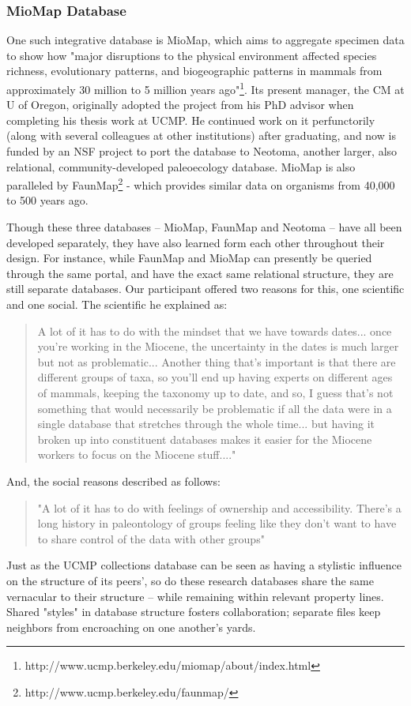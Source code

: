 \subsubsection{MioMap Database}
One such integrative database is MioMap, which aims to aggregate specimen data to show how "major disruptions to the physical environment affected species richness, evolutionary patterns, and biogeographic patterns in mammals from approximately 30 million to 5 million years ago"\footnote{http://www.ucmp.berkeley.edu/miomap/about/index.html}. Its present manager, the CM at U of Oregon, originally adopted the project from his PhD advisor when completing his thesis work at UCMP. He continued work on it perfunctorily (along with several colleagues at other institutions) after graduating, and now is funded by an NSF project to port the database to Neotoma, another larger, also relational, community-developed paleoecology database. MioMap is also paralleled by FaunMap\footnote{http://www.ucmp.berkeley.edu/faunmap/} - which provides similar data on organisms from 40,000 to 500 years ago.

Though these three databases -- MioMap, FaunMap and Neotoma -- have all been developed separately, they have also learned form each other throughout their design. For instance, while FaunMap and MioMap can presently be queried through the same portal, and have the exact same relational structure, they are still separate databases.  Our participant offered two reasons for this, one scientific and one social. The scientific he explained as:
\begin{quote}
A lot of it has to do with the mindset that we have towards dates... once you're working in the Miocene, the uncertainty in the dates is much larger but not as problematic... Another thing that's important is that there are different groups of taxa, so you'll end up having experts on different ages of mammals, keeping the taxonomy up to date, and so, I guess that's not something that would necessarily be problematic if all the data were in a single database that stretches through the whole time... but having it broken up into constituent databases makes it easier for the Miocene workers to focus on the Miocene stuff...."
\end{quote}
And, the social reasons described as follows:
\begin{quote}
"A lot of it has to do with feelings of ownership and accessibility. There's a long history in paleontology of groups feeling like they don't want to have to share control of the data with other groups"
\end{quote}
Just as the UCMP collections database can be seen as having a stylistic influence on the structure of its peers', so do these research databases share the same vernacular to their structure -- while remaining within relevant property lines. Shared "styles" in database structure fosters collaboration; separate files keep neighbors from encroaching on one another's yards.

